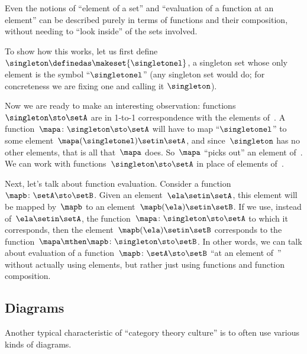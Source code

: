 \begin{example}
    Even the notions of ``element of a set'' and ``evaluation of a function at an element'' can be described purely in terms of functions and their composition, without needing to ``look inside'' of the sets involved.

    To show how this works, let us first define $\singleton \definedas \makeset{\singletonel}$, a singleton set whose only element is the symbol ``$\singletonel$'' (any singleton set would do; for concreteness we are fixing one and calling it $\singleton$).

    Now we are ready to make an interesting observation: functions~$\singleton \sto \setA$ are in 1-to-1 correspondence with the elements of~\setA.
    A function~$\mapa\colon \singleton \sto \setA$ will have to map ``$\singletonel$'' to some element~$\mapa(\singletonel) \setin\setA$, and since~$\singleton$ has no other elements, that is all that~$\mapa$ does.
    So~$\mapa$ ``picks out'' an element of~\setA.
    We can work with functions~$\singleton \sto \setA$ in place of elements of~\setA.

    Next, let's talk about function evaluation.
    Consider a function~$\mapb \colon \setA \sto \setB$.
    Given an element~$\ela \setin\setA$, this element will be mapped by~$\mapb$ to an element~$\mapb(\ela) \setin\setB$.
    If we use, instead of~$\ela \setin\setA$, the function~$\mapa \colon \singleton \sto \setA$ to which it corresponds, then the element~$\mapb(\ela) \setin\setB$ corresponds to the function~$\mapa \mthen \mapb\colon \singleton \sto \setB$.
    In other words, we can talk about evaluation of a function~$\mapb \colon \setA \sto \setB$ ``at an element of~\setA'' without actually using elements, but rather just using functions and function composition.
\end{example}

\subsection{Diagrams}

Another typical characteristic of ``category theory culture'' is to often use various kinds of diagrams.

